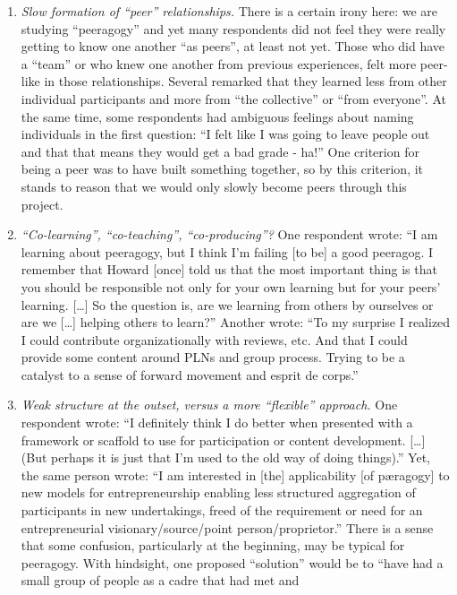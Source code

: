 \begin{enumerate}
\item
  \emph{Slow formation of ``peer'' relationships.} There is a certain
  irony here: we are studying ``peeragogy'' and yet many respondents did
  not feel they were really getting to know one another ``as peers'', at
  least not yet. Those who did have a ``team'' or who knew one another
  from previous experiences, felt more peer-like in those relationships.
  Several remarked that they learned less from other individual
  participants and more from ``the collective'' or ``from everyone''. At
  the same time, some respondents had ambiguous feelings about naming
  individuals in the first question: ``I felt like I was going to leave
  people out and that that means they would get a bad grade - ha!'' One
  criterion for being a peer was to have built something together, so by
  this criterion, it stands to reason that we would only slowly become
  peers through this project.
\item
  \emph{``Co-learning'', ``co-teaching'', ``co-producing''?} One
  respondent wrote: ``I am learning about peeragogy, but I think I'm
  failing {[}to be{]} a good peeragog. I remember that Howard {[}once{]}
  told us that the most important thing is that you should be
  responsible not only for your own learning but for your peers'
  learning. {[}\ldots{}{]} So the question is, are we learning from
  others by ourselves or are we {[}\ldots{}{]} helping others to
  learn?'' Another wrote: ``To my surprise I realized I could contribute
  organizationally with reviews, etc. And that I could provide some
  content around PLNs and group process. Trying to be a catalyst to a
  sense of forward movement and esprit de corps.''
\item
  \emph{Weak structure at the outset, versus a more ``flexible''
  approach.} One respondent wrote: ``I definitely think I do better when
  presented with a framework or scaffold to use for participation or
  content development. {[}\ldots{}{]} (But perhaps it is just that I'm
  used to the old way of doing things).'' Yet, the same person wrote:
  ``I am interested in {[}the{]} applicability {[}of pæragogy{]} to new
  models for entrepreneurship enabling less structured aggregation of
  participants in new undertakings, freed of the requirement or need for
  an entrepreneurial visionary/source/point person/proprietor.'' There
  is a sense that some confusion, particularly at the beginning, may be
  typical for peeragogy. With hindsight, one proposed ``solution'' would
  be to ``have had a small group of people as a cadre that had met and

\end{enumerate}
